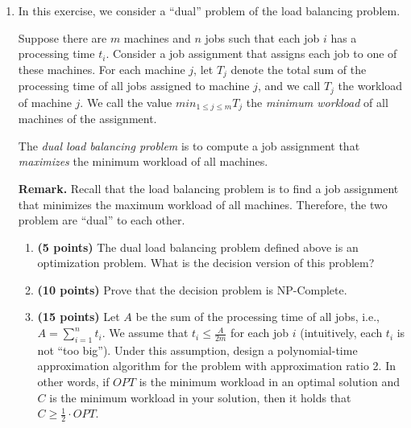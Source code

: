 \documentclass[paper=a4, fontsize=11pt]{scrartcl} %
\numberwithin{figure}{section} %
\numberwithin{table}{section} %
\begin{document}
\begin{enumerate}
\item In this exercise, we consider a \enquote{dual} problem of the load balancing problem.

Suppose there are $m$ machines and $n$ jobs such that each job $i$ has a processing time $t_i$.
Consider a job assignment that assigns each job to one of these machines. For each machine
$j$, let $T_j$ denote the total sum of the processing time of all jobs assigned to machine $j$, and
we call $T_j$ the workload of machine $j$. We call the value $min_{1 \leq j \leq m} T_j$ the \textit{minimum workload} of all machines of the assignment.

The \textit{dual load balancing problem} is to compute a job assignment that \textit{maximizes} the minimum
workload of all machines.

\textbf{Remark.} Recall that the load balancing problem is to find a job assignment that minimizes
the maximum workload of all machines. Therefore, the two problem are \enquote{dual} to each other.
\begin{enumerate}
\item \textbf{(5 points)} The dual load balancing problem defined above is an optimization problem.
What is the decision version of this problem?
\item \textbf{(10 points)} Prove that the decision problem is NP-Complete.
\item \textbf{(15 points)} Let $A$ be the sum of the processing time of all jobs, i.e., $A = \sum\limits_{i=1}^n t_i$. We assume that $t_i \leq \frac{A}{2m}$ for each job $i$ (intuitively, each $t_i$ is not \enquote{too big}). Under this assumption, design a polynomial-time approximation algorithm for the problem with
approximation ratio 2. In other words, if $OPT$ is the minimum workload in an optimal
solution and $C$ is the minimum workload in your solution, then it holds that $C \geq \frac{1}{2} \cdot OPT$.
\end{enumerate}
\end{enumerate}

\end{document}
